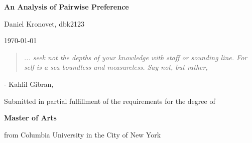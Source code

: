 \begin{center}
\Large \textbf{An Analysis of Pairwise Preference}
  
\vspace{0.2in}
\normalsize Daniel Kronovet, dbk2123
  
\today

\vspace{1in}

\begin{quotation}
\textit{
	... seek not the depths of your knowledge with staff or sounding line.
	For self is a sea boundless and measureless.
	Say not,  but rather, 
	}
\end{quotation}
- Kahlil Gibran, \textit{} 

\vspace*{\fill}

Submitted in partial fulfillment of the requirements for the degree of

\textbf{Master of Arts}

from Columbia University in the City of New York
\end{center}